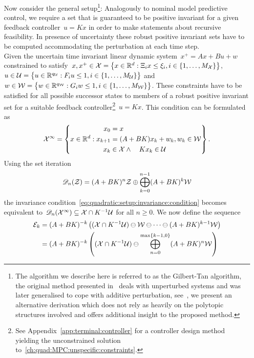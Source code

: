 %
%
\noindent\mysplit Now consider the general setup\footnote{
%
The algorithm we describe here is referred to as the Gilbert-Tan algorithm, the original method presented in~\cite{Gilbert:1991} deals with unperturbed systems and was later generalised to cope with additive perturbation, see~\cite{Kolmanovsky:1995,Kolmanovsky:1998}, we present an alternative derivation which does not rely as heavily on the polytopic structures involved and offers additional insight to the proposed method.}:
%
Analogously to nominal model predictive control, we require a set that is guaranteed to be positive invariant for a given feedback controller~$u=Kx$ in order to make statements about recursive feasibility.
%
In presence of uncertainty these robust positive invariant sets have to be computed accommodating the perturbation at each time step.
%
\\[1em]
%
Given the uncertain time invariant linear dynamic system~$x^+=Ax+Bu+w$ constrained to satisfy~$x,x^+\in\mathcal X = \bigl\{x\in\mathbb R^d:\Xi_ix\leq\xi_i,i\in\{1,\dots,M_\mathcal X\}\bigr\}$, $u\in\mathcal U=\bigl\{u\in\mathbb R^{q_\mathcal U}:F_i u\leq 1,i\in\{1,\dots,M_\mathcal U\}\bigr\}$ and $w\in\mathcal W=\bigl\{w\in\mathbb R^{q_\mathcal W}:G_iw\leq1,i\in\{1,\dots,M_\mathcal W\}\bigr\}$.
%
These constraints have to be satisfied for all possible successor states to members of a robust positive invariant set for a suitable feedback controller\footnote{See Appendix~\ref{app:terminal:controller} for a controller design method yielding the unconstrained solution to~\eqref{ch:quad:MPC:unspecific:constraints}.}~$u=Kx$.
%
This condition can be formulated as
%
\begin{equation}\label{eq:quadratic:setup:invariance:condition}
	\mathcal X^\infty = \left\{x\in\mathbb R^d: \begin{aligned}x_0&=x\\ x_{k+1} &= (A+BK)x_k + w_k,w_k\in\mathcal W\\
	x_k&\in\mathcal X\wedge\quad	Kx_k\in\mathcal U
	\end{aligned}\right\}.
\end{equation}
%
Using the set iteration 
%
\begin{equation}\label{eq:def:Dn}
	\mathscr D_n(\mathcal Z) = (A+BK)^n\mathcal Z\oplus\bigoplus_{k=0}^{n-1}(A+BK)^k\mathcal W
\end{equation}
%
the invariance condition~\eqref{eq:quadratic:setup:invariance:condition} becomes equivalent to~$\mathscr D_n(\mathcal X^\infty)\subseteq\mathcal X\cap K^{-1}\mathcal U$ for all $n\geq0$.
%
We now define the sequence 
%
\begin{equation}\label{eq:definition:Ek:sequence:for:set:iteration}\begin{aligned}
	\mathcal E_k &= (A+BK)^{-k}\left((\mathcal X\cap K^{-1}\mathcal U)\ominus\mathcal W\ominus\dots\ominus(A+BK)^{k-1}\mathcal W\right)\\ 
	&= (A+BK)^{-k}\left((\mathcal X\cap K^{-1}\mathcal U)\ominus \bigoplus_{n=0}^{\max\{k-1,0\}}(A+BK)^n\mathcal W\right)
\end{aligned}\end{equation}
